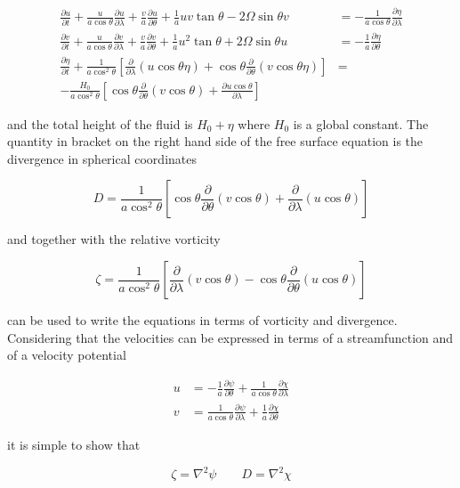 \[\begin{aligned}
\frac{\partial u}{\partial t}  +\frac{u}{a \cos\theta} \frac{\partial u}{\partial \lambda} +\frac{v}{a} \frac{\partial u}{\partial \theta} +\frac{1}{a} u v \tan\theta- 2\Omega\sin\theta  v &= -\frac{1}{a \cos\theta}\frac{\partial \eta}{\partial \lambda} \\
\frac{\partial v}{\partial t}  +\frac{u}{a \cos\theta} \frac{\partial v}{\partial \lambda} +\frac{v}{a} \frac{\partial v}{\partial \theta}  +\frac{1}{a} u^2 \tan\theta + 2\Omega\sin\theta u &= -\frac{1}{a}\frac{\partial \eta}{\partial \theta} \label{uvsphfluxform} \\
\frac{\partial \eta}{\partial t} +\frac{1}{a \cos^2\theta}\left[\frac{\partial }{\partial \lambda}(u\cos\theta \eta) +\cos\theta\frac{\partial }{\partial \theta}(v\cos\theta \eta) \right] &= \\
-  \frac{H_0}{a \cos^2\theta} \left[\cos\theta \frac{\partial }{\partial \theta} (v \cos\theta ) + \frac{\partial u\cos\theta}{\partial \lambda}\right]
\end{aligned}\]

and the total height of the fluid is \(H_0+\eta\) where \(H_0\) is a
global constant. The quantity in bracket on the right hand side of the
free surface equation is the divergence in spherical coordinates

\[D=\frac{1}{a \cos^2\theta}\left[\cos\theta \frac{\partial }{\partial \theta} (v \cos\theta ) + \frac{\partial }{\partial \lambda}(u\cos\theta)\right]\]

and together with the relative vorticity

\[\zeta=\frac{1}{a \cos^2\theta}\left[ \frac{\partial }{\partial \lambda} (v \cos\theta ) - \cos\theta\frac{\partial }{\partial \theta}(u\cos\theta)\right]\]

can be used to write the equations in terms of vorticity and divergence.
Considering that the velocities can be expressed in terms of a
streamfunction and of a velocity potential

\[\begin{aligned}
u &= -\frac{1}{a}\frac{\partial \psi}{\partial \theta} + \frac{1}{a\cos\theta}\frac{\partial \chi}{\partial \lambda}\\
v &= \frac{1}{a\cos\theta}\frac{\partial \psi}{\partial \lambda} + \frac{1}{a}\frac{\partial \chi}{\partial \theta}
\end{aligned}\]

it is simple to show that

\[\zeta = \nabla^2 \psi \qquad D = \nabla^2\chi\]


